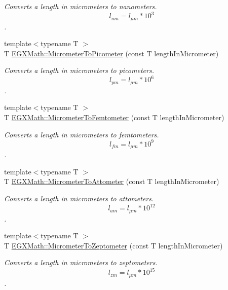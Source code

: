 \begin{DoxyCompactItemize}
\begin{DoxyCompactList}\small\item\em Converts a length in micrometers to nanometers. \[ l_{nm}=l_{\mu m} * 10^{3} \]. \end{DoxyCompactList}\item 
{\footnotesize template$<$typename T $>$ }\\T \mbox{\hyperlink{group___e_g_x_math-_conversions-_length_conversions-_s_i-_micrometer-_s_i_ga912ed4989391eeb5d25f43e99108502e}{E\+G\+X\+Math\+::\+Micrometer\+To\+Picometer}} (const T length\+In\+Micrometer)
\begin{DoxyCompactList}\small\item\em Converts a length in micrometers to picometers. \[ l_{pm}=l_{\mu m} * 10^{6} \]. \end{DoxyCompactList}\item 
{\footnotesize template$<$typename T $>$ }\\T \mbox{\hyperlink{group___e_g_x_math-_conversions-_length_conversions-_s_i-_micrometer-_s_i_gab60084517b51f3138b70e4af762dc4ea}{E\+G\+X\+Math\+::\+Micrometer\+To\+Femtometer}} (const T length\+In\+Micrometer)
\begin{DoxyCompactList}\small\item\em Converts a length in micrometers to femtometers. \[ l_{fm}=l_{\mu m} * 10^{9} \]. \end{DoxyCompactList}\item 
{\footnotesize template$<$typename T $>$ }\\T \mbox{\hyperlink{group___e_g_x_math-_conversions-_length_conversions-_s_i-_micrometer-_s_i_ga296eef01f570febc71c616741e02e561}{E\+G\+X\+Math\+::\+Micrometer\+To\+Attometer}} (const T length\+In\+Micrometer)
\begin{DoxyCompactList}\small\item\em Converts a length in micrometers to attometers. \[ l_{am}=l_{\mu m} * 10^{12} \]. \end{DoxyCompactList}\item 
{\footnotesize template$<$typename T $>$ }\\T \mbox{\hyperlink{group___e_g_x_math-_conversions-_length_conversions-_s_i-_micrometer-_s_i_ga34a06da7fb2b2f8791f5beefd4727be8}{E\+G\+X\+Math\+::\+Micrometer\+To\+Zeptometer}} (const T length\+In\+Micrometer)
\begin{DoxyCompactList}\small\item\em Converts a length in micrometers to zeptometers. \[ l_{zm}=l_{\mu m} * 10^{15} \]. \end{DoxyCompactList}\item 

\end{DoxyCompactItemize}
